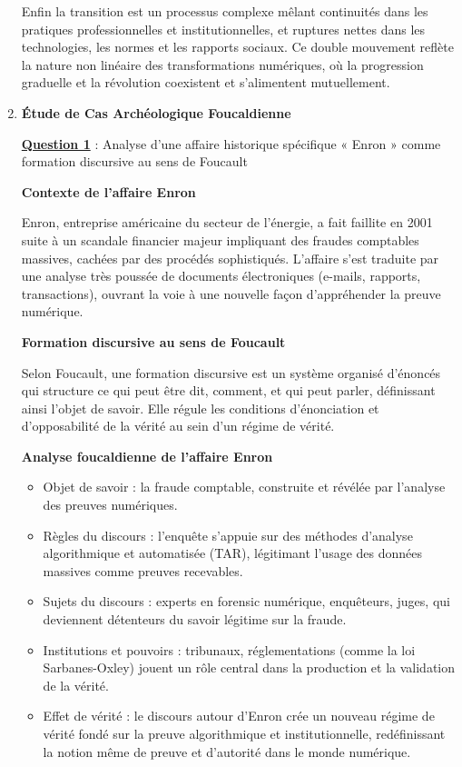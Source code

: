 \documentclass[12pt, a4paper]{article}
\newcommand{\question}[1]{\textbf{\underline{Question #1}}}
\begin{document}
\begin{enumerate}[label=\textbf{\arabic*.}]
		Enfin la transition est un processus complexe mêlant continuités dans les pratiques professionnelles et institutionnelles, et ruptures nettes dans les technologies, les normes et les rapports sociaux. Ce double mouvement reflète la nature non linéaire des transformations numériques, où la progression graduelle et la révolution coexistent et s'alimentent mutuellement.
		
		\item \textbf{Étude de Cas Archéologique Foucaldienne}
		
		\question{1} : Analyse d'une affaire historique spécifique « Enron » comme formation discursive au sens de Foucault
		
		\textbf{Contexte de l'affaire Enron}
		
		Enron, entreprise américaine du secteur de l'énergie, a fait faillite en 2001 suite à un scandale financier majeur impliquant des fraudes comptables massives, cachées par des procédés sophistiqués. L'affaire s'est traduite par une analyse très poussée de documents électroniques (e-mails, rapports, transactions), ouvrant la voie à une nouvelle façon d'appréhender la preuve numérique.
		
		\textbf{Formation discursive au sens de Foucault}
		
		Selon Foucault, une formation discursive est un système organisé d'énoncés qui structure ce qui peut être dit, comment, et qui peut parler, définissant ainsi l'objet de savoir. Elle régule les conditions d'énonciation et d'opposabilité de la vérité au sein d'un régime de vérité.
		
		\textbf{Analyse foucaldienne de l'affaire Enron}
		\begin{itemize}
			\item Objet de savoir : la fraude comptable, construite et révélée par l'analyse des preuves numériques.
			\item Règles du discours : l'enquête s'appuie sur des méthodes d'analyse algorithmique et automatisée (TAR), légitimant l'usage des données massives comme preuves recevables.
			\item Sujets du discours : experts en forensic numérique, enquêteurs, juges, qui deviennent détenteurs du savoir légitime sur la fraude.
			\item Institutions et pouvoirs : tribunaux, réglementations (comme la loi Sarbanes-Oxley) jouent un rôle central dans la production et la validation de la vérité.
			\item Effet de vérité : le discours autour d'Enron crée un nouveau régime de vérité fondé sur la preuve algorithmique et institutionnelle, redéfinissant la notion même de preuve et d'autorité dans le monde numérique.
		\end{itemize}
		

\end{enumerate}
\end{document}
